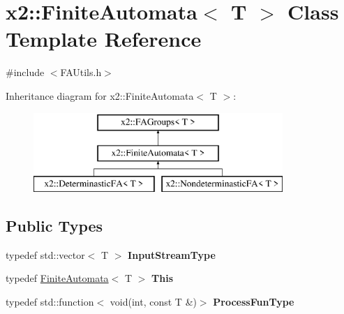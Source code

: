 \hypertarget{classx2_1_1_finite_automata}{}\section{x2\+:\+:Finite\+Automata$<$ T $>$ Class Template Reference}
\label{classx2_1_1_finite_automata}


{\ttfamily \#include $<$F\+A\+Utils.\+h$>$}

Inheritance diagram for x2\+:\+:Finite\+Automata$<$ T $>$\+:\begin{figure}[H]
\begin{center}
\leavevmode
\includegraphics[height=3.000000cm]{classx2_1_1_finite_automata}
\end{center}
\end{figure}
\subsection*{Public Types}
\begin{DoxyCompactItemize}
\item 
\mbox{\label{classx2_1_1_finite_automata_a1e633b48bb19ff2de32c037f305eb084}} 
typedef std\+::vector$<$ T $>$ {\bfseries Input\+Stream\+Type}
\item 
\mbox{\label{classx2_1_1_finite_automata_a31301b2b4958a62b3565e41c23eca2e4}} 
typedef \hyperlink{classx2_1_1_finite_automata}{Finite\+Automata}$<$ T $>$ {\bfseries This}
\item 
\mbox{\label{classx2_1_1_finite_automata_ab8b9e1d69f545925a2d0ae7b6d91bdc4}} 
typedef std\+::function$<$ void(int, const T \&)$>$ {\bfseries Process\+Fun\+Type}
\end{DoxyCompactItemize}
